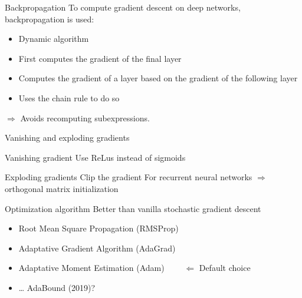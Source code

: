 \begin{frame}{Backpropagation}
  To compute gradient descent on deep networks, backpropagation is used:

  \begin{itemize}
    \item Dynamic algorithm
    \item First computes the gradient of the final layer
    \item Computes the gradient of a layer based on the gradient of the following layer
    \item Uses the chain rule to do so
  \end{itemize}

  $\Rightarrow$ Avoids recomputing subexpressions.
\end{frame}

\begin{frame}{Vanishing and exploding gradients}
\end{frame}

\begin{frame}{Vanishing gradient}
  Use ReLus instead of sigmoids
  \vfill
\end{frame}

\begin{frame}{Exploding gradients}
  Clip the gradient
  For recurrent neural networks $\Rightarrow$ orthogonal matrix initialization
\end{frame}

\begin{frame}{Optimization algorithm}
  Better than vanilla stochastic gradient descent
  \begin{itemize}
    \item Root Mean Square Propagation (RMSProp)
    \item Adaptative Gradient Algorithm (AdaGrad)
    \item Adaptative Moment Estimation (Adam)    $\qquad\Leftarrow$ Default choice
    \item … AdaBound (2019)?
  \end{itemize}
\end{frame}

